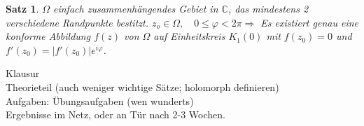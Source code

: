 \documentclass[ngerman,halfparskip]{scrartcl}
\newtheorem*{satz*}{Satz}
\theoremstyle{definition}
\def\C{\mathbb C}
\begin{document}
\begin{satz*}
$\Omega$ einfach zusammenhängendes Gebiet in $\C$, das mindestens 2 verschiedene Randpunkte bestitzt. $z_o\in\Omega, \quad 0\leq \varphi <2\pi \Rightarrow $ Es existiert genau eine konforme Abbildung $f(z)$ von $\Omega$ auf Einheitskreis $K_1(0)$ mit $f(z_0)=0$ und $f'(z_0)=|f'(z_0)|e^{i\varphi}$. 
\end{satz*}










Klausur \\
	Theorieteil (auch weniger wichtige Sätze; holomorph definieren)\\
	Aufgaben: Übungsaufgaben (wen wunderts)\\
	
	Ergebnisse im Netz, oder an Tür nach 2-3 Wochen.
\end{document}

